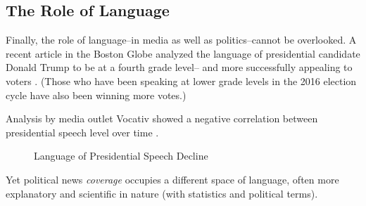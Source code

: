 \subsection{The Role of Language}
Finally, the role of language--in media as well as politics--cannot be overlooked. A recent article in the Boston Globe analyzed the language of presidential candidate Donald Trump to be at a fourth grade level-- and more successfully appealing to voters \cite{Globe-language-article}. (Those who have been speaking at lower grade levels in the 2016 election cycle have also been winning more votes.)

Analysis by media outlet Vocativ showed a negative correlation between presidential speech level over time \cite{Vocativ-speech}.

\begin{figure}[h!] 
\centering
  \caption{Language of Presidential Speech Decline}
\end{figure}

Yet political news \emph{coverage} occupies a different space of language, often more explanatory and scientific in nature (with statistics and political terms). 

\cite{weisberg2008seductive}

 





















